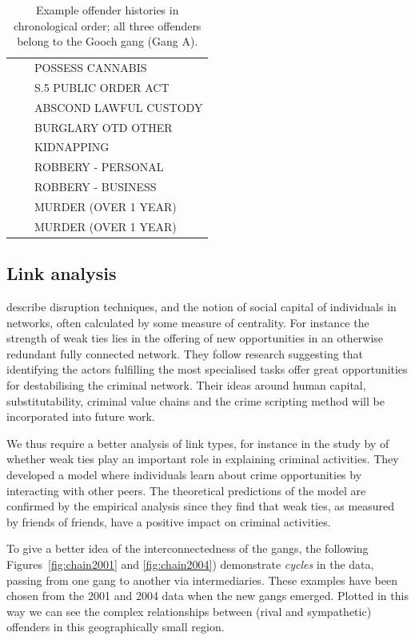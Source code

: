 \documentclass[twocolumn]{svjour3}          %
\theoremstyle{definition}
\begin{document}
\begin{table}[!ht]
{\begin{tabular}{lll}
          &       & POSSESS CANNABIS       \\
          &       & S.5 PUBLIC ORDER ACT   \\
          &       & ABSCOND LAWFUL CUSTODY \\
          &       & BURGLARY OTD OTHER     \\
          &       & KIDNAPPING             \\
          &       & ROBBERY - PERSONAL     \\
          &       & ROBBERY - BUSINESS     \\
          &       & MURDER (OVER 1 YEAR)   \\
          &       & MURDER (OVER 1 YEAR)   \\
    \end{tabular}}
 \caption{Example offender histories in chronological order; all three offenders belong to
   the Gooch gang (Gang A).}
  \label{tab:histories}
\end{table}


\subsection{Link analysis}

\citet{duijn-et-al:2014} describe disruption techniques, and the
notion of social capital of individuals in networks, often calculated
by some measure of centrality. For instance the strength of weak ties
lies in the offering of new opportunities in an otherwise redundant
fully connected network. They follow research suggesting that
identifying the actors fulfilling the most specialised tasks offer
great opportunities for destabilising the criminal network. Their
ideas around human capital, substitutability, criminal value chains
and the crime scripting method will be incorporated into future work.

We thus require a better analysis of link types, for instance in the study
by \citet{PatacchiniZenou2008} of whether weak ties play an important
role in explaining criminal activities. They developed a model where
individuals learn about crime opportunities by interacting with other
peers. The theoretical predictions of the model are confirmed by the
empirical analysis since they find that weak ties, as measured by
friends of friends, have a positive impact on criminal activities.

To give a better idea of the interconnectedness of the gangs, the
following Figures~\ref{fig:chain2001} and \ref{fig:chain2004}) demonstrate
\emph{cycles} in the data, passing from one gang to another via
intermediaries.  These examples have been chosen from the 2001 and
2004 data when the new gangs emerged. Plotted in this way we can see
the complex relationships between (rival and sympathetic) offenders in
this geographically small region.
\end{document}
